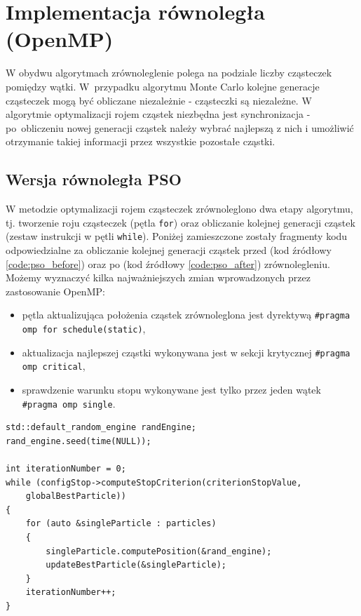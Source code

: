 \documentclass[11pt, a4paper, oneside]{article}
\begin{document}
\section{Implementacja równoległa (OpenMP)}

W obydwu algorytmach zrównoleglenie polega na podziale liczby cząsteczek pomiędzy wątki. W~przypadku algorytmu Monte Carlo kolejne generacje cząsteczek mogą być obliczane niezależnie - cząsteczki są niezależne. W algorytmie optymalizacji rojem cząstek niezbędna jest synchronizacja - po~obliczeniu nowej generacji cząstek należy wybrać najlepszą z nich i umożliwić otrzymanie takiej informacji przez wszystkie pozostałe cząstki.

\subsection{Wersja równoległa PSO}

W metodzie optymalizacji rojem cząsteczek zrównoleglono dwa etapy algorytmu, tj. tworzenie roju cząsteczek (pętla \lstinline[style=mycpp]{for}) oraz obliczanie kolejnej generacji cząstek (zestaw instrukcji w pętli \lstinline[style=mycpp]{while}). Poniżej zamieszczone zostały fragmenty kodu odpowiedzialne za obliczanie kolejnej generacji cząstek przed (kod źródłowy \ref{code:pso_before}) oraz po (kod źródłowy \ref{code:pso_after}) zrównolegleniu. Możemy wyznaczyć kilka najważniejszych zmian wprowadzonych przez zastosowanie OpenMP:\nopagebreak
\begin{itemize}
\item pętla aktualizująca położenia cząstek zrównoleglona jest dyrektywą \lstinline[style=mycpp]{#pragma omp for schedule(static)},
\item aktualizacja najlepszej cząstki wykonywana jest w sekcji krytycznej \lstinline[style=mycpp]{#pragma omp critical},
\item sprawdzenie warunku stopu wykonywane jest tylko przez jeden wątek \lstinline[style=mycpp]{#pragma omp single}.
\end{itemize}

\begin{lstlisting}[style=mycpp, label=code:pso_before, caption={Optymalizacja PSO - kod sekwencyjny.}]
std::default_random_engine randEngine;
rand_engine.seed(time(NULL));

int iterationNumber = 0;
while (configStop->computeStopCriterion(criterionStopValue,
	globalBestParticle))
{
    for (auto &singleParticle : particles)
    {
        singleParticle.computePosition(&rand_engine);
        updateBestParticle(&singleParticle);
    }
    iterationNumber++;
}
\end{lstlisting}
\end{document}
